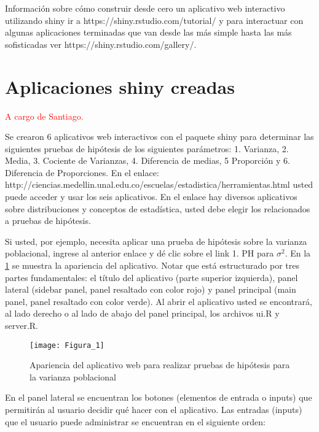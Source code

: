 \documentclass[]{comunicaciones}
\newcommand{\pkg}[1]{{\normalfont\fontseries{b}\selectfont #1}}
\begin{document}
Información sobre cómo construir desde cero un aplicativo web interactivo utilizando shiny ir a https://shiny.rstudio.com/tutorial/ y para interactuar con algunas aplicaciones terminadas que van desde las más simple hasta las más sofisticadas ver https://shiny.rstudio.com/gallery/.

\section{Aplicaciones \pkg{shiny} creadas}
\textcolor{red}{A cargo de Santiago.}

Se crearon 6 aplicativos web interactivos con el paquete shiny para determinar las siguientes pruebas de hipótesis de los siguientes parámetros: 1. Varianza, 2. Media, 3. Cociente de Varianzas, 4. Diferencia de medias, 5 Proporción y 6. Diferencia de Proporciones. En el enlace: http://ciencias.medellin.unal.edu.co/escuelas/estadistica/herramientas.html usted puede acceder y usar los seis aplicativos. En el enlace hay diversos aplicativos sobre distribuciones y conceptos de estadística, usted debe elegir los relacionados a pruebas de hipótesis.

Si usted, por ejemplo,  necesita aplicar una prueba de hipótesis sobre la varianza poblacional, ingrese al anterior enlace y dé clic sobre el link 1. PH para $\sigma^2$. En la \ref{figura1} se muestra la apariencia del aplicativo. Notar que está estructurado por tres partes fundamentales: el título del aplicativo (parte superior izquierda), panel lateral (sidebar panel, panel resaltado con color rojo) y panel principal (main panel, panel resaltado con color verde). Al abrir el aplicativo usted se encontrará, al lado derecho o al lado de abajo del panel principal, los archivos ui.R y server.R.

\begin{figure}[h]
  \centering
  \texttt{[image: Figura\_1]}
  \caption{Apariencia del aplicativo web para realizar pruebas de hipótesis para la varianza poblacional}
  \label{figura1}
\end{figure}

En el panel lateral se encuentran los botones (elementos de entrada o inputs) que permitirán al usuario decidir qué hacer con el aplicativo. Las entradas (inputs) que el usuario puede administrar se encuentran en el siguiente orden:
\end{document}
